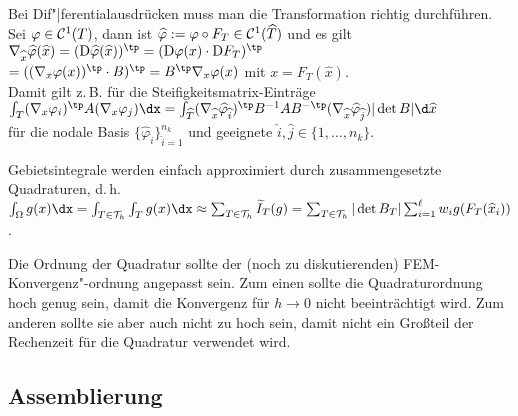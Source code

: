 \begin{Bem}
    Bei Dif"|ferentialausdrücken muss man die Transformation richtig durchführen.
    Sei $\varphi \in \mathcal{C}^1(T)$, dann ist
    $\widehat{\varphi} := \varphi \circ F_T \in \mathcal{C}^1(\widehat{T})$ und es gilt
    $\nabla_{\widehat{x}} \widehat{\varphi}(\widehat{x})
    = (\D\widehat{\varphi}(\widehat{x}))^\tp
    = (\D\varphi(x) \cdot \D F_T)^\tp$\\
    $= ((\nabla_x \varphi(x))^\tp \cdot B)^\tp
    = B^\tp \nabla_x \varphi(x)$ mit $x = F_T(\widehat{x})$.\\
    Damit gilt z.\,B. für die Steifigkeitsmatrix-Einträge\\
    $\int_T (\nabla_x \varphi_i)^\tp A (\nabla_x \varphi_j) \dx
    = \int_{\widehat{T}} (\nabla_{\widehat{x}} \widehat{\varphi}_{\widehat{i}})^\tp
    B^{-1} A B^{-\tp} (\nabla_{\widehat{x}} \widehat{\varphi}_{\widehat{j}})
    |\det B| \d\widehat{x}$\\
    für die nodale Basis $\{\widehat{\varphi}_{\widehat{i}}\}_{\widehat{i}=1}^{n_k}$ und
    geeignete $\widehat{i}, \widehat{j} \in \{1, \dotsc, n_k\}$.
\end{Bem}

\begin{Bem}
    Gebietsintegrale werden einfach approximiert durch zusammengesetzte Quadraturen, d.\,h.
    $\int_\Omega g(x)\dx
    = \int_{T \in \T_h} \int_T g(x)\dx
    \approx \sum_{T \in \T_h} \widetilde{I}_T(g)
    = \sum_{T \in \T_h} |\det B_T| \sum_{i=1}^\ell w_i g(F_T(\widehat{x}_i))$.
\end{Bem}

\begin{Bem}
    Die Ordnung der Quadratur sollte der (noch zu diskutierenden) FEM-Konvergenz"-ordnung
    angepasst sein.
    Zum einen sollte die Quadraturordnung hoch genug sein, damit die Konvergenz für $h \to 0$
    nicht beeinträchtigt wird.
    Zum anderen sollte sie aber auch nicht zu hoch sein, damit nicht ein Großteil der Rechenzeit
    für die Quadratur verwendet wird.
\end{Bem}

\pagebreak

\subsection{%
    Assemblierung%
}

